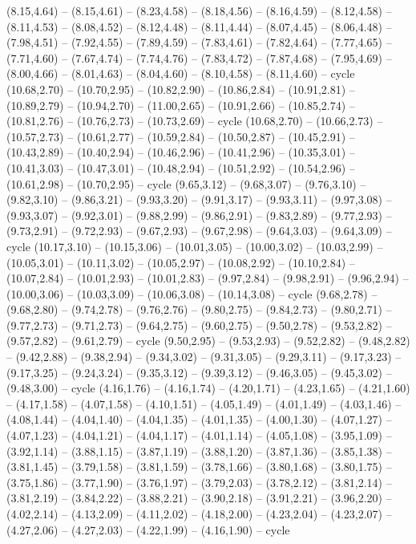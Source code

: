 \expandafter\def\csname geo:gebiet:UZB\endcsname{
  (8.15,4.64) -- (8.15,4.61) -- (8.23,4.58) -- (8.18,4.56) -- (8.16,4.59) -- (8.12,4.58) -- (8.11,4.53) -- (8.08,4.52) -- (8.12,4.48) -- (8.11,4.44) -- (8.07,4.45) -- (8.06,4.48) -- (7.98,4.51) -- (7.92,4.55) -- (7.89,4.59) -- (7.83,4.61) -- (7.82,4.64) -- (7.77,4.65) -- (7.71,4.60) -- (7.67,4.74) -- (7.74,4.76) -- (7.83,4.72) -- (7.87,4.68) -- (7.95,4.69) -- (8.00,4.66) -- (8.01,4.63) -- (8.04,4.60) -- (8.10,4.58) -- (8.11,4.60) -- cycle}
\expandafter\def\csname geo:gebiet:PNG\endcsname{
  (10.68,2.70) -- (10.70,2.95) -- (10.82,2.90) -- (10.86,2.84) -- (10.91,2.81) -- (10.89,2.79) -- (10.94,2.70) -- (11.00,2.65) -- (10.91,2.66) -- (10.85,2.74) -- (10.81,2.76) -- (10.76,2.73) -- (10.73,2.69) -- cycle}
\expandafter\def\csname geo:gebiet:IDN\endcsname{
  (10.68,2.70) -- (10.66,2.73) -- (10.57,2.73) -- (10.61,2.77) -- (10.59,2.84) -- (10.50,2.87) -- (10.45,2.91) -- (10.43,2.89) -- (10.40,2.94) -- (10.46,2.96) -- (10.41,2.96) -- (10.35,3.01) -- (10.41,3.03) -- (10.47,3.01) -- (10.48,2.94) -- (10.51,2.92) -- (10.54,2.96) -- (10.61,2.98) -- (10.70,2.95) -- cycle
  (9.65,3.12) -- (9.68,3.07) -- (9.76,3.10) -- (9.82,3.10) -- (9.86,3.21) -- (9.93,3.20) -- (9.91,3.17) -- (9.93,3.11) -- (9.97,3.08) -- (9.93,3.07) -- (9.92,3.01) -- (9.88,2.99) -- (9.86,2.91) -- (9.83,2.89) -- (9.77,2.93) -- (9.73,2.91) -- (9.72,2.93) -- (9.67,2.93) -- (9.67,2.98) -- (9.64,3.03) -- (9.64,3.09) -- cycle
  (10.17,3.10) -- (10.15,3.06) -- (10.01,3.05) -- (10.00,3.02) -- (10.03,2.99) -- (10.05,3.01) -- (10.11,3.02) -- (10.05,2.97) -- (10.08,2.92) -- (10.10,2.84) -- (10.07,2.84) -- (10.01,2.93) -- (10.01,2.83) -- (9.97,2.84) -- (9.98,2.91) -- (9.96,2.94) -- (10.00,3.06) -- (10.03,3.09) -- (10.06,3.08) -- (10.14,3.08) -- cycle
  (9.68,2.78) -- (9.68,2.80) -- (9.74,2.78) -- (9.76,2.76) -- (9.80,2.75) -- (9.84,2.73) -- (9.80,2.71) -- (9.77,2.73) -- (9.71,2.73) -- (9.64,2.75) -- (9.60,2.75) -- (9.50,2.78) -- (9.53,2.82) -- (9.57,2.82) -- (9.61,2.79) -- cycle
  (9.50,2.95) -- (9.53,2.93) -- (9.52,2.82) -- (9.48,2.82) -- (9.42,2.88) -- (9.38,2.94) -- (9.34,3.02) -- (9.31,3.05) -- (9.29,3.11) -- (9.17,3.23) -- (9.17,3.25) -- (9.24,3.24) -- (9.35,3.12) -- (9.39,3.12) -- (9.46,3.05) -- (9.45,3.02) -- (9.48,3.00) -- cycle}
\expandafter\def\csname geo:gebiet:ARG\endcsname{
  (4.16,1.76) -- (4.16,1.74) -- (4.20,1.71) -- (4.23,1.65) -- (4.21,1.60) -- (4.17,1.58) -- (4.07,1.58) -- (4.10,1.51) -- (4.05,1.49) -- (4.01,1.49) -- (4.03,1.46) -- (4.08,1.44) -- (4.04,1.40) -- (4.04,1.35) -- (4.01,1.35) -- (4.00,1.30) -- (4.07,1.27) -- (4.07,1.23) -- (4.04,1.21) -- (4.04,1.17) -- (4.01,1.14) -- (4.05,1.08) -- (3.95,1.09) -- (3.92,1.14) -- (3.88,1.15) -- (3.87,1.19) -- (3.88,1.20) -- (3.87,1.36) -- (3.85,1.38) -- (3.81,1.45) -- (3.79,1.58) -- (3.81,1.59) -- (3.78,1.66) -- (3.80,1.68) -- (3.80,1.75) -- (3.75,1.86) -- (3.77,1.90) -- (3.76,1.97) -- (3.79,2.03) -- (3.78,2.12) -- (3.81,2.14) -- (3.81,2.19) -- (3.84,2.22) -- (3.88,2.21) -- (3.90,2.18) -- (3.91,2.21) -- (3.96,2.20) -- (4.02,2.14) -- (4.13,2.09) -- (4.11,2.02) -- (4.18,2.00) -- (4.23,2.04) -- (4.23,2.07) -- (4.27,2.06) -- (4.27,2.03) -- (4.22,1.99) -- (4.16,1.90) -- cycle}
